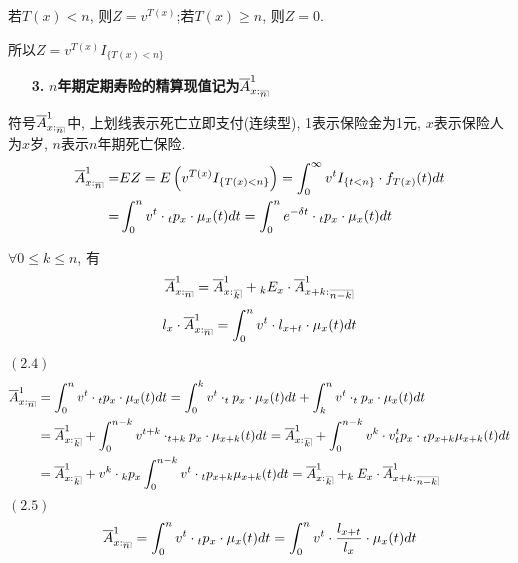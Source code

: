 \documentclass[a4paper,10pt]{ctexbook}
\makeatletter
\newcommand{\hei}{\CJKfamily{hei}}      %
\DeclareRobustCommand{\annu}[1]{_{%
    \def\arraystretch{0}%
    \setlength\arraycolsep{1pt}%
    \setlength\arrayrulewidth{.2pt}%
    \begin{array}[b]{@{}c|}\hline
        \\[\arraycolsep]%
        \scriptstyle #1%
    \end{array}%
}}
\makeatother
\begin{document}
若$T(x)<n$, 则$Z=v^{T(x)}$;若$T(x)\geqslant n$, 则$Z=0$.

所以$Z=v^{T(x)}I_{\{T(x)<n\}}$
\begin{itemize}
    \item[{\bf\hei 3.}]{\bf\hei $n$年期定期寿险的精算现值记为$\overline{A}_{x:\annu{n}}^1$}
\end{itemize}
\begin{remark}
    符号$\overline{A}_{x:\annu{n}}^1$中, 上划线表示死亡立即支付(连续型), 1表示保险金为1元, $x$表示保险人为$x$岁, $n$表示$n$年期死亡保险.
    \begin{align*}
        \overline{A}_{x:\annu{n}}^1= & EZ=E\left( v^{T\left( x \right)}I_{\left\{ T\left( x \right) <n \right\}} \right) =\int_0^{\infty}{v^{t}I_{\left\{ t <n \right\}}\cdot f_{T(x)}(t)dt} \\
        =                            & \int_0^{n}{v^{t}\cdot {}_tp_x\cdot \mu_{x}(t)dt}=\int_0^{n}{e^{-\delta t}\cdot {}_tp_x\cdot \mu_{x}(t)dt}
    \end{align*}
\end{remark}

\begin{proposition}
    $\forall 0\leqslant k\leqslant n$, 有
    \begin{align}\label{4}
        \overline{A}_{x:\annu{n}}^1=\overline{A}_{x:}^1{}_{\annu k}+{}_kE_x\cdot\overline{A}_{x+k:}^1{}_{\annu {n-k}}
    \end{align}
    \begin{align}\label{5}
        l_x\cdot\overline{A}_{x:\annu{n}}^1=\int_0^{n}{v^{t}\cdot l_{x+t}\cdot \mu_{x}(t)dt}
    \end{align}
\end{proposition}


\proof
$(2.4)$
\begin{align*}
    \overline{A}_{x:\annu{n}}^1 & =\int_0^{n}{v^{t}\cdot{}_tp_x\cdot \mu_{x}(t)dt} = \int_0^{k}{v^{t}\cdot  _tp_x\cdot \mu_{x}(t)dt} +\int_k^{n}{v^{t}\cdot  _tp_x\cdot \mu_{x}(t)dt}                                                    \\
                                & = \overline{A}_{x:}^1{}_{\annu k} +\int_0^{n-k}{v^{t+k}\cdot  _{t+k}p_x\cdot \mu_{x+k}(t)dt}= \overline{A}_{x:}^1{}_{\annu k} +\int_0^{n-k}{v^{k}\cdot v^{t}  _{t}p_x\cdot{}_{t}p_{x+k}\mu_{x+k}(t)dt} \\
                                & =\overline{A}_{x:}^1{}_{\annu k} +v^{k}\cdot {}_{k}p_x\int_0^{n-k}{ v^{t} \cdot{}_{t}p_{x+k}\mu_{x+k}(t)dt}=\overline{A}_{x:}^1{}_{\annu k}+_kE_x\cdot\overline{A}_{x+k:}^1{}_{\annu{n-k}}             \\
\end{align*}
$(2.5)$
$$\overline{A}_{x:\annu{n}}^1=\int_0^{n}{v^{t}\cdot{}_tp_x\cdot \mu_{x}(t)dt}=\int_0^{n}{v^{t}\cdot \frac{l_{x+t}}{l_x}\cdot \mu_{x}(t)dt}$$
\end{document}
